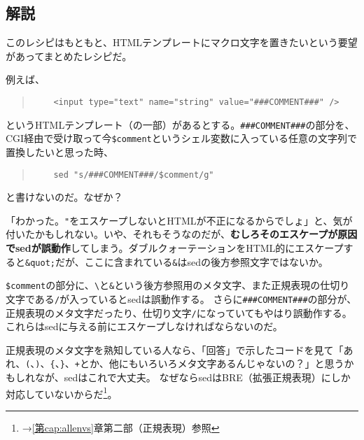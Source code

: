 \subsection*{解説}

このレシピはもともと、HTMLテンプレートにマクロ文字を置きたいという要望があってまとめたレシピだ。

例えば、

\begin{quote}
\begin{verbatim}
	<input type="text" name="string" value="###COMMENT###" />
\end{verbatim}
\end{quote}

というHTMLテンプレート（の一部）があるとする。\verb|###COMMENT###|の部分を、CGI経由で受け取って今\verb|$comment|というシェル変数に入っている任意の文字列で置換したいと思った時、

\begin{quote}
\begin{verbatim}
	sed "s/###COMMENT###/$comment/g"
\end{verbatim}
\end{quote}

と書けないのだ。なぜか？

「わかった。\verb|"|をエスケープしないとHTMLが不正になるからでしょ」と、気が付いたかもしれない。いや、それもそうなのだが、\textbf{むしろそのエスケープが原因でsedが誤動作}してしまう。ダブルクォーテーションをHTML的にエスケープすると\verb|&quot;|だが、ここに含まれている\verb|&|はsedの後方参照文字ではないか。

\verb|$comment|の部分に、\verb|\|と\verb|&|という後方参照用のメタ文字、また正規表現の仕切り文字である\verb|/|が入っているとsedは誤動作する。
さらに\verb|###COMMENT###|の部分が、正規表現のメタ文字だったり、仕切り文字\verb|/|になっていてもやはり誤動作する。これらはsedに与える前にエスケープしなければならないのだ。

正規表現のメタ文字を熟知している人なら、「回答」で示したコードを見て「あれ、\verb|(|、\verb|)|、\verb|{|、\verb|}|、\verb|+|とか、他にもいろいろメタ文字あるんじゃないの？」と思うかもしれなが、sedはこれで大丈夫。
なぜならsedはBRE（拡張正規表現）にしか対応していないからだ\footnote{→\ref{第cap:allenvs}章第二部（正規表現）参照}。
